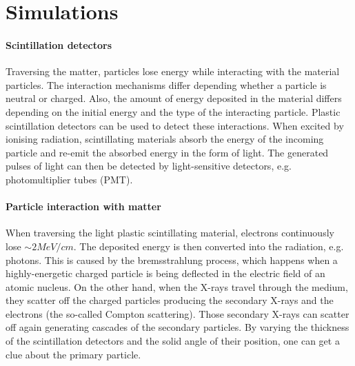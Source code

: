 \documentclass[12pt]{article}
\begin{document}
\newpage
\section{Simulations}
\paragraph{Scintillation detectors}
Traversing the matter, particles lose energy while interacting with the material particles. The interaction mechanisms differ depending whether a particle is neutral or charged. Also, the amount of energy deposited in the material differs depending on the initial energy and the type of the interacting particle. Plastic scintillation detectors can be used to detect these interactions. When  excited by ionising radiation, scintillating materials absorb the energy of the incoming particle and re-emit the absorbed energy in the form of light. The generated pulses of light can then be detected by light-sensitive detectors, e.g. photomultiplier tubes (PMT).

\paragraph{Particle interaction with matter}
When traversing the light plastic scintillating material, electrons continuously lose $\sim 2 MeV/cm$. The deposited energy is then converted into the radiation, e.g. photons. This is caused by the bremsstrahlung process, which happens when a highly-energetic charged particle is being deflected in the electric field of an atomic nucleus. On the other hand, when the X-rays travel through the medium, they scatter off the charged particles producing the secondary X-rays and the electrons (the so-called Compton scattering). Those secondary X-rays can scatter off again generating cascades of the secondary particles. By varying the thickness of the scintillation detectors and the solid angle of their position, one can get a clue about the primary particle. 
\end{document}
